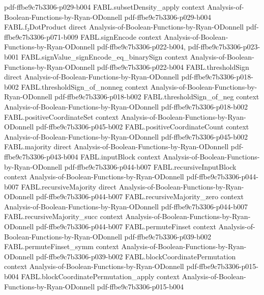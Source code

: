 \begin{theorem}
  {pdf-ffbe9c7b3306-p029-b004}
\proofstep
  {FABL.subsetDensity_apply}
  {context}
  {Analysis-of-Boolean-Functions-by-Ryan-ODonnell}
  {pdf-ffbe9c7b3306-p029-b004}
\proofstep
  {FABL.f₂DotProduct}
  {direct}
  {Analysis-of-Boolean-Functions-by-Ryan-ODonnell}
  {pdf-ffbe9c7b3306-p071-b009}
\proofstep
  {FABL.signEncode}
  {context}
  {Analysis-of-Boolean-Functions-by-Ryan-ODonnell}
  {pdf-ffbe9c7b3306-p022-b004,
    pdf-ffbe9c7b3306-p023-b001}
\proofstep
  {FABL.signValue_signEncode_eq_binarySign}
  {context}
  {Analysis-of-Boolean-Functions-by-Ryan-ODonnell}
  {pdf-ffbe9c7b3306-p022-b004}
\proofstep
  {FABL.thresholdSign}
  {direct}
  {Analysis-of-Boolean-Functions-by-Ryan-ODonnell}
  {pdf-ffbe9c7b3306-p018-b002}
\proofstep
  {FABL.thresholdSign_of_nonneg}
  {context}
  {Analysis-of-Boolean-Functions-by-Ryan-ODonnell}
  {pdf-ffbe9c7b3306-p018-b002}
\proofstep
  {FABL.thresholdSign_of_neg}
  {context}
  {Analysis-of-Boolean-Functions-by-Ryan-ODonnell}
  {pdf-ffbe9c7b3306-p018-b002}
\proofstep
  {FABL.positiveCoordinateSet}
  {context}
  {Analysis-of-Boolean-Functions-by-Ryan-ODonnell}
  {pdf-ffbe9c7b3306-p045-b002}
\proofstep
  {FABL.positiveCoordinateCount}
  {context}
  {Analysis-of-Boolean-Functions-by-Ryan-ODonnell}
  {pdf-ffbe9c7b3306-p045-b002}
\proofstep
  {FABL.majority}
  {direct}
  {Analysis-of-Boolean-Functions-by-Ryan-ODonnell}
  {pdf-ffbe9c7b3306-p043-b004}
\proofstep
  {FABL.inputBlock}
  {context}
  {Analysis-of-Boolean-Functions-by-Ryan-ODonnell}
  {pdf-ffbe9c7b3306-p044-b007}
\proofstep
  {FABL.recursiveInputBlock}
  {context}
  {Analysis-of-Boolean-Functions-by-Ryan-ODonnell}
  {pdf-ffbe9c7b3306-p044-b007}
\proofstep
  {FABL.recursiveMajority}
  {direct}
  {Analysis-of-Boolean-Functions-by-Ryan-ODonnell}
  {pdf-ffbe9c7b3306-p044-b007}
\proofstep
  {FABL.recursiveMajority_zero}
  {context}
  {Analysis-of-Boolean-Functions-by-Ryan-ODonnell}
  {pdf-ffbe9c7b3306-p044-b007}
\proofstep
  {FABL.recursiveMajority_succ}
  {context}
  {Analysis-of-Boolean-Functions-by-Ryan-ODonnell}
  {pdf-ffbe9c7b3306-p044-b007}
\proofstep
  {FABL.permuteFinset}
  {context}
  {Analysis-of-Boolean-Functions-by-Ryan-ODonnell}
  {pdf-ffbe9c7b3306-p039-b002}
\proofstep
  {FABL.permuteFinset_symm}
  {context}
  {Analysis-of-Boolean-Functions-by-Ryan-ODonnell}
  {pdf-ffbe9c7b3306-p039-b002}
\proofstep
  {FABL.blockCoordinatePermutation}
  {context}
  {Analysis-of-Boolean-Functions-by-Ryan-ODonnell}
  {pdf-ffbe9c7b3306-p015-b004}
\proofstep
  {FABL.blockCoordinatePermutation_apply}
  {context}
  {Analysis-of-Boolean-Functions-by-Ryan-ODonnell}
  {pdf-ffbe9c7b3306-p015-b004}

\end{theorem}
